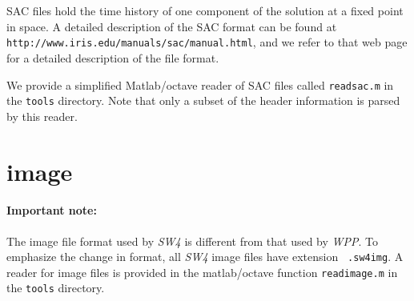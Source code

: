 \documentclass[11pt]{report}
\begin{document}
SAC files hold the time history of one component of the solution at a fixed point in space.  A
detailed description of the SAC format can be found at {\tt
http://www.iris.edu/manuals/sac/manual.html}, and we refer to that web page for a detailed
description of the file format.

We provide a simplified Matlab/octave reader of SAC files called {\tt readsac.m} in the {\tt tools}
directory. Note that only a subset of the header information is parsed by this reader.

\section{image}\label{sec:image-format}

\paragraph{Important note:} The image file format used by \emph{SW4} is different from that used by
\emph{WPP}. To emphasize the change in format, all \emph{SW4} image files have extension {\tt
  .sw4img}. A reader for image files is provided in the matlab/octave function \verb+readimage.m+ in
the \verb+tools+ directory.
\end{document}
